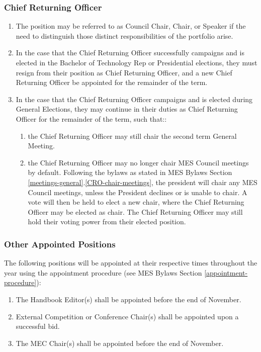 \subsubsection{Chief Returning Officer}
\label{chief-returning-officer-eligibility}
\begin{enumerate}
 \item
  The position may be referred to as Council Chair, Chair, or Speaker if the need to distinguish those distinct responsibilities of the portfolio arise.
 \item
  In the case that the Chief Returning Officer successfully campaigns and is elected in the Bachelor of Technology Rep or Presidential elections, they must resign from their position as Chief Returning Officer, and a new Chief Returning Officer be appointed for the remainder of the term.
 \item
  In the case that the Chief Returning Officer campaigns and is elected during General Elections, they may continue in their duties as Chief Returning Officer for the remainder of the term, such that::

  \begin{enumerate}
   \item
    the Chief Returning Officer may still chair the second term General Meeting.
   \item
    the Chief Returning Officer may no longer chair MES Council meetings by default. Following the bylaws as stated in MES Bylaws Section \ref{meetings-general}.\ref{CRO-chair-meetings}, the president will chair any MES Council meetings, unless the President declines or is unable to chair. A vote will then be held to elect a new chair, where the Chief Returning Officer may be elected as chair. The Chief Returning Officer may still hold their voting power from their elected position. %
  \end{enumerate}
\end{enumerate}

\subsubsection{Other Appointed Positions}
\label{other-appointed-positions}
The following positions will be appointed at their respective times
throughout the year using the appointment procedure (see MES Bylaws
Section \ref{appointment-procedure}):

\begin{enumerate}
 \item
  The Handbook Editor(s) shall be appointed before the end of November.
 \item
  External Competition or Conference Chair(s) shall be appointed upon a successful bid.
 \item
  The MEC Chair(s) shall be appointed before the end of November.
\end{enumerate}
% 
